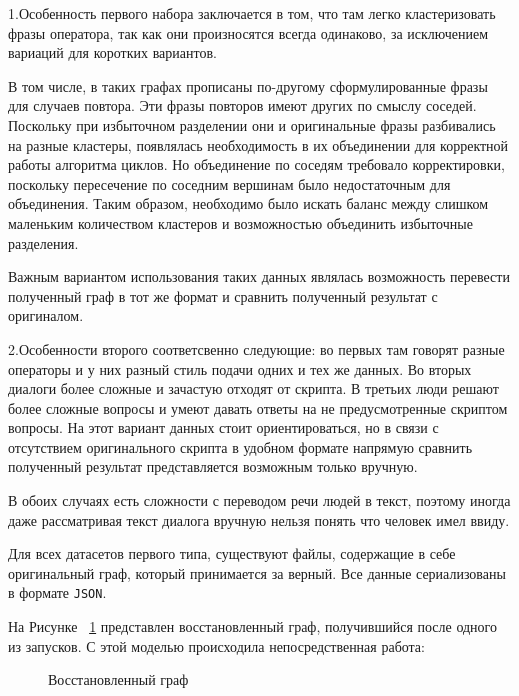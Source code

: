 \documentclass[times,specification,annotation]{itmo-student-thesis}
\begin{document}
	1.Особенность первого набора заключается в том, что там легко кластеризовать фразы оператора, так как они произносятся всегда одинаково, за исключением вариаций для коротких вариантов.
	
	В том числе, в таких графах прописаны по-другому сформулированные фразы для случаев повтора. Эти фразы повторов имеют других по смыслу соседей. Поскольку при избыточном разделении они и оригинальные фразы разбивались на разные кластеры, появлялась необходимость в их объединении для корректной работы алгоритма циклов. Но объединение по соседям требовало корректировки, поскольку пересечение по соседним вершинам было недостаточным для объединения. Таким образом, необходимо было искать баланс между слишком маленьким количеством кластеров и возможностью объединить избыточные разделения. 
	
	Важным вариантом использования таких данных являлась возможность  перевести полученный граф в тот же формат и сравнить полученный результат с оригиналом.
	
	2.Особенности второго соответсвенно следующие: во первых там говорят разные операторы и у них разный стиль подачи одних и тех же данных. Во вторых диалоги более сложные и зачастую отходят от скрипта. В третьих люди решают более сложные вопросы и умеют давать ответы на не предусмотренные скриптом вопросы. На этот вариант данных стоит ориентироваться, но в связи с отсутствием оригинального скрипта в удобном формате напрямую сравнить полученный результат представляется возможным только вручную.
	
	В обоих случаях есть сложности с переводом речи людей в текст, поэтому иногда даже рассматривая текст диалога вручную нельзя понять что человек имел ввиду.
	
	Для всех датасетов первого типа, существуют файлы, содержащие в себе оригинальный граф, который принимается за верный. Все данные сериализованы в формате \texttt{JSON}. 
	
	На Рисунке ~\ref{fig:graph:restore} представлен восстановленный граф, получившийся после одного из запусков. С этой моделью происходила непосредственная работа:
	
	\begin{figure}[H]
		\caption{Восстановленный граф}
		\label{fig:graph:restore}
	\end{figure}
\end{document}
